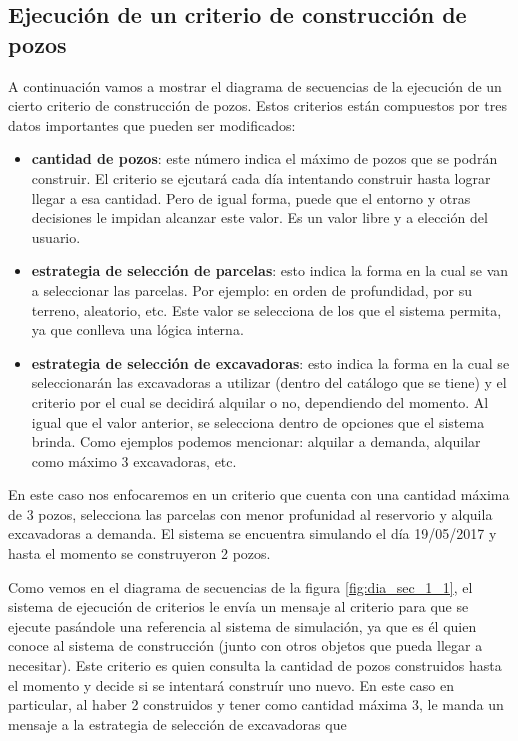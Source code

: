 \subsection{Ejecución de un criterio de construcción de pozos}

\par A continuación vamos a mostrar el diagrama de secuencias de la ejecución de un cierto criterio de construcción de pozos. Estos criterios están compuestos por tres datos importantes que pueden ser modificados:

\begin{itemize}
  \item \textbf{cantidad de pozos}: este número indica el máximo de pozos que se podrán construir. El criterio se ejcutará cada día intentando construir hasta lograr llegar a esa cantidad. Pero de igual forma, puede que el entorno y otras decisiones le impidan alcanzar este valor. Es un valor libre y a elección del usuario.
  \item \textbf{estrategia de selección de parcelas}: esto indica la forma en la cual se van a seleccionar las parcelas. Por ejemplo: en orden de profundidad, por su terreno, aleatorio, etc. Este valor se selecciona de los que el sistema permita, ya que conlleva una lógica interna.

  \item \textbf{estrategia de selección de excavadoras}: esto indica la forma en la cual se seleccionarán las excavadoras a utilizar (dentro del catálogo que se tiene) y el criterio por el cual se decidirá alquilar o no, dependiendo del momento. Al igual que el valor anterior, se selecciona dentro de opciones que el sistema brinda. Como ejemplos podemos mencionar: alquilar a demanda, alquilar como máximo 3 excavadoras, etc.
\end{itemize}

\par En este caso nos enfocaremos en un criterio que cuenta con una cantidad máxima de 3 pozos, selecciona las parcelas con menor profunidad al reservorio y alquila excavadoras a demanda. El sistema se encuentra simulando el día 19/05/2017 y hasta el momento se construyeron 2 pozos.
\par Como vemos en el diagrama de secuencias de la figura \ref{fig:dia_sec_1_1}, el sistema de ejecución de criterios le envía un mensaje al criterio para que se ejecute pasándole una referencia al sistema de simulación, ya que es él quien conoce al sistema de construcción (junto con otros objetos que pueda llegar a necesitar). Este criterio es quien consulta la cantidad de pozos construidos hasta el momento y decide si se intentará construír uno nuevo. En este caso en particular, al haber 2 construidos y tener como cantidad máxima 3, le manda un mensaje a la estrategia de selección de excavadoras que

